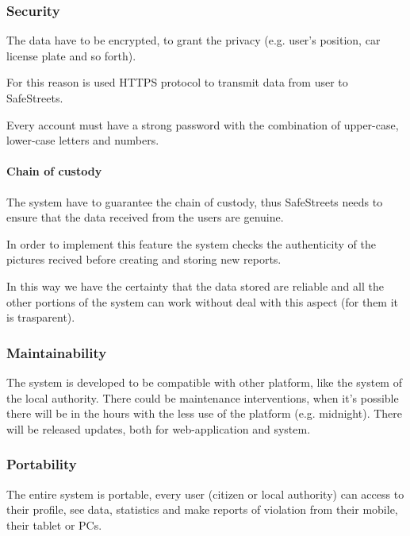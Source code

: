 \subsubsection{Security}
The data have to be encrypted, to grant the privacy (e.g. user's position, car license plate and so forth). 

For this reason is used HTTPS protocol to transmit data from user to SafeStreets.

Every account must have a strong password with the combination of upper-case, lower-case letters and numbers.

\paragraph{Chain of custody}
\hfill

The system have to guarantee the chain of custody, thus SafeStreets needs to ensure that the data received from the users are genuine.

In order to implement this feature the system checks the authenticity of the pictures recived before creating and storing new reports.

In this way we have the certainty that the data stored are reliable and all the other portions of the system can work without deal with this aspect (for them it is trasparent).

\subsubsection{Maintainability}
The system is developed to be compatible with other platform, like the system of the local authority.
There could be maintenance interventions, when it's possible there will be in the hours with the less use of the platform (e.g. midnight).
There will be released updates, both for web-application and system.

\subsubsection{Portability}
The entire system is portable, every user (citizen or local authority) can access to their profile, see data, statistics and make reports of violation from their mobile, their tablet or PCs.

